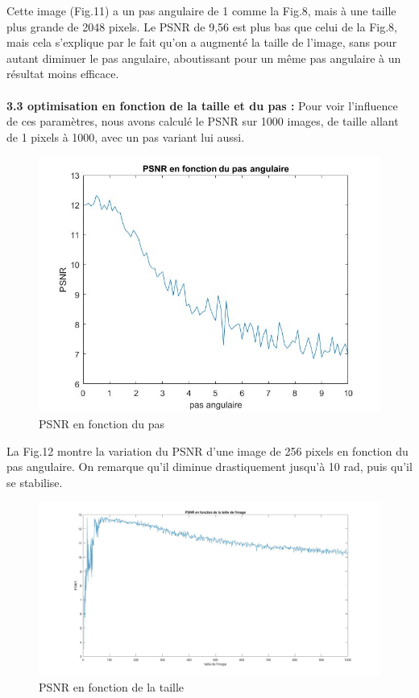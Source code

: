 \documentclass[conference]{IEEEtran}
\begin{document}
Cette image (Fig.11) a un pas angulaire de 1 comme la Fig.8, mais à une taille plus grande de 2048 pixels. Le PSNR de 9,56 est plus bas que celui de la Fig.8, mais cela s'explique par le fait qu'on a augmenté la taille de l'image, sans pour autant diminuer le pas angulaire, aboutissant pour un même pas angulaire à un résultat moins efficace.
\\
\\
\textbf{3.3 optimisation en fonction de la taille et du pas : }
Pour voir l'influence de ces paramètres, nous avons calculé le PSNR sur 1000 images, de taille allant de 1 pixels à 1000, avec un pas variant lui aussi.

\begin{figure}[H]
\centering
\includegraphics[scale=0.30]{PSNR_en_fonction_du_pas_angulaire}
	\caption[PSNR en fonction du pas]{PSNR en fonction du pas}
\label{fig:gallery}
\end{figure}

La Fig.12 montre la variation du PSNR d'une image de 256 pixels en fonction du pas angulaire. On remarque qu'il diminue drastiquement jusqu'à 10 rad, puis qu'il se stabilise.

\begin{figure}[H]
\centering
\includegraphics[scale=0.13]{PSNR3}
	\caption[PSNR en fonction de la taille]{PSNR en fonction de la taille}
\label{fig:gallery}
\end{figure}
\end{document}
